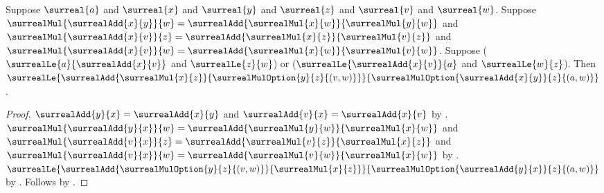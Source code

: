 \begin{lemma}\label{surreal_distributive_option_le_mixed_right}
    Suppose $\surreal{a}$ and $\surreal{x}$ and $\surreal{y}$ and
        $\surreal{z}$ and $\surreal{v}$ and $\surreal{w}$.
    Suppose
        $\surrealMul{\surrealAdd{x}{y}}{w}
            =\surrealAdd{\surrealMul{x}{w}}{\surrealMul{y}{w}}$ and
        $\surrealMul{\surrealAdd{x}{v}}{z}
            =\surrealAdd{\surrealMul{x}{z}}{\surrealMul{v}{z}}$ and
        $\surrealMul{\surrealAdd{x}{v}}{w}
            =\surrealAdd{\surrealMul{x}{w}}{\surrealMul{v}{w}}$.
    Suppose
        ($\surrealLe{a}{\surrealAdd{x}{v}}$ and
            $\surrealLe{z}{w}$) or
        ($\surrealLe{\surrealAdd{x}{v}}{a}$ and
            $\surrealLe{w}{z}$).
    Then
        $\surrealLe
            {\surrealAdd{\surrealMul{x}{z}}
                {\surrealMulOption{y}{z}{(v,w)}}}
            {\surrealMulOption{\surrealAdd{x}{y}}{z}{(a,w)}}$.
\end{lemma}
\begin{proof}
    $\surrealAdd{y}{x}=\surrealAdd{x}{y}$ and
        $\surrealAdd{v}{x}=\surrealAdd{x}{v}$
        by .
    $\surrealMul{\surrealAdd{y}{x}}{w}
        =\surrealAdd{\surrealMul{y}{w}}{\surrealMul{x}{w}}$ and
        $\surrealMul{\surrealAdd{v}{x}}{z}
        =\surrealAdd{\surrealMul{v}{z}}{\surrealMul{x}{z}}$ and
        $\surrealMul{\surrealAdd{v}{x}}{w}
        =\surrealAdd{\surrealMul{v}{w}}{\surrealMul{x}{w}}$
        by .
    $\surrealLe
        {\surrealAdd{\surrealMulOption{y}{z}{(v,w)}}
            {\surrealMul{x}{z}}}
        {\surrealMulOption{\surrealAdd{y}{x}}{z}{(a,w)}}$
        by .
    Follows by
        .
\end{proof}

